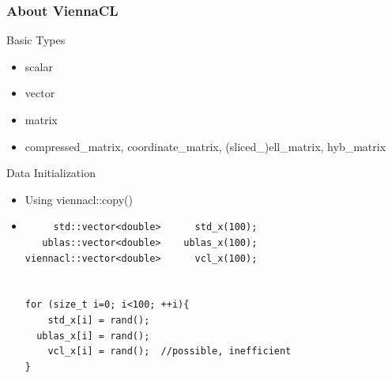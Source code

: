 


\begin{frame}[fragile]
\frametitle{About ViennaCL}

 \begin{block}{Basic Types}
   \begin{itemize}
    \item scalar
    \item vector
    \item matrix
    \item compressed\_matrix, coordinate\_matrix, (sliced\_)ell\_matrix, hyb\_matrix
   \end{itemize}
 \end{block}

 \begin{block}{Data Initialization}
    \begin{itemize}
     \item Using viennacl::copy() 
    \item  { \black
  \begin{lstlisting}
     std::vector<double>      std_x(100);
   ublas::vector<double>    ublas_x(100);
viennacl::vector<double>      vcl_x(100);


for (size_t i=0; i<100; ++i){
    std_x[i] = rand();
  ublas_x[i] = rand();
    vcl_x[i] = rand();  //possible, inefficient
}
  \end{lstlisting} }

 \end{itemize}

 \end{block}
\end{frame}



